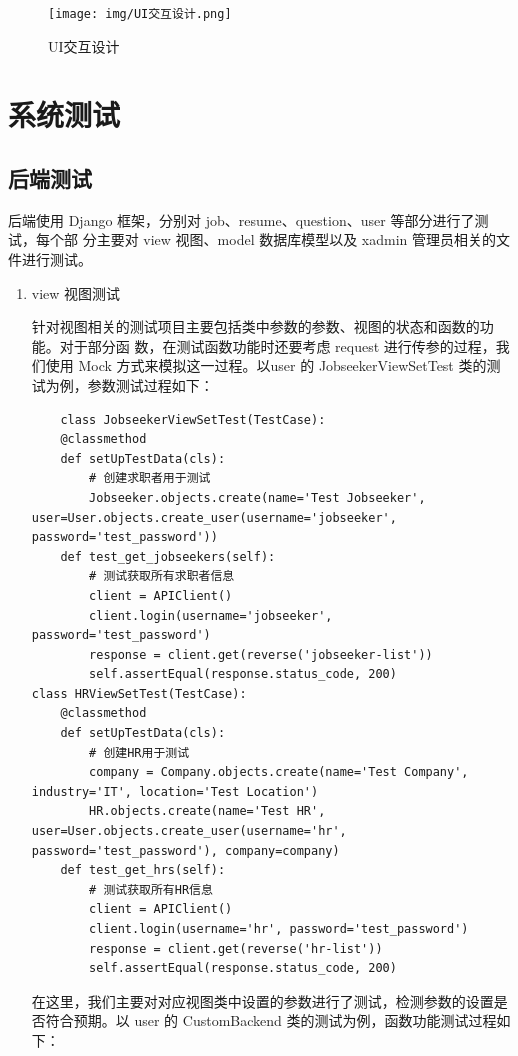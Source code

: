 \documentclass[UTF8,a4paper,10pt]{ctexart}
\begin{document}
\begin{figure}[H]
    \centering
    \texttt{[image: img/UI交互设计.png]} 
    \caption{UI交互设计}
    \label{fig:UI交互设计}
\end{figure}

\section{系统测试}
\subsection{后端测试}
后端使用 Django 框架，分别对 job、resume、question、user 等部分进行了测试，每个部
分主要对 view 视图、model 数据库模型以及 xadmin 管理员相关的文件进行测试。
\begin{enumerate}
    \item  view 视图测试
\par\hspace{2em} 针对视图相关的测试项目主要包括类中参数的参数、视图的状态和函数的功能。对于部分函
数，在测试函数功能时还要考虑 request 进行传参的过程，我们使用 Mock 方式来模拟这一过程。以user 的 JobseekerViewSetTest 类的测试为例，参数测试过程如下：
\begin{lstlisting}
    class JobseekerViewSetTest(TestCase):
    @classmethod
    def setUpTestData(cls):
        # 创建求职者用于测试
        Jobseeker.objects.create(name='Test Jobseeker', user=User.objects.create_user(username='jobseeker', password='test_password'))
    def test_get_jobseekers(self):
        # 测试获取所有求职者信息
        client = APIClient()
        client.login(username='jobseeker', password='test_password')
        response = client.get(reverse('jobseeker-list'))
        self.assertEqual(response.status_code, 200)
class HRViewSetTest(TestCase):
    @classmethod
    def setUpTestData(cls):
        # 创建HR用于测试
        company = Company.objects.create(name='Test Company', industry='IT', location='Test Location')
        HR.objects.create(name='Test HR', user=User.objects.create_user(username='hr', password='test_password'), company=company)
    def test_get_hrs(self):
        # 测试获取所有HR信息
        client = APIClient()
        client.login(username='hr', password='test_password')
        response = client.get(reverse('hr-list'))
        self.assertEqual(response.status_code, 200)
\end{lstlisting}
\par\hspace{2em} 在这里，我们主要对对应视图类中设置的参数进行了测试，检测参数的设置是否符合预期。以 user 的 CustomBackend 类的测试为例，函数功能测试过程如下：

\end{enumerate}
\end{document}
